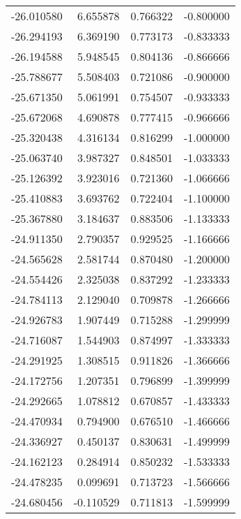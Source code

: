 \begin{tabular}{rrrr}
      -26.010580 &         6.655878 &    0.766322 &  -0.800000 \\
      -26.294193 &         6.369190 &    0.773173 &  -0.833333 \\
      -26.194588 &         5.948545 &    0.804136 &  -0.866666 \\
      -25.788677 &         5.508403 &    0.721086 &  -0.900000 \\
      -25.671350 &         5.061991 &    0.754507 &  -0.933333 \\
      -25.672068 &         4.690878 &    0.777415 &  -0.966666 \\
      -25.320438 &         4.316134 &    0.816299 &  -1.000000 \\
      -25.063740 &         3.987327 &    0.848501 &  -1.033333 \\
      -25.126392 &         3.923016 &    0.721360 &  -1.066666 \\
      -25.410883 &         3.693762 &    0.722404 &  -1.100000 \\
      -25.367880 &         3.184637 &    0.883506 &  -1.133333 \\
      -24.911350 &         2.790357 &    0.929525 &  -1.166666 \\
      -24.565628 &         2.581744 &    0.870480 &  -1.200000 \\
      -24.554426 &         2.325038 &    0.837292 &  -1.233333 \\
      -24.784113 &         2.129040 &    0.709878 &  -1.266666 \\
      -24.926783 &         1.907449 &    0.715288 &  -1.299999 \\
      -24.716087 &         1.544903 &    0.874997 &  -1.333333 \\
      -24.291925 &         1.308515 &    0.911826 &  -1.366666 \\
      -24.172756 &         1.207351 &    0.796899 &  -1.399999 \\
      -24.292665 &         1.078812 &    0.670857 &  -1.433333 \\
      -24.470934 &         0.794900 &    0.676510 &  -1.466666 \\
      -24.336927 &         0.450137 &    0.830631 &  -1.499999 \\
      -24.162123 &         0.284914 &    0.850232 &  -1.533333 \\
      -24.478235 &         0.099691 &    0.713723 &  -1.566666 \\
      -24.680456 &        -0.110529 &    0.711813 &  -1.599999 \\

\end{tabular}
